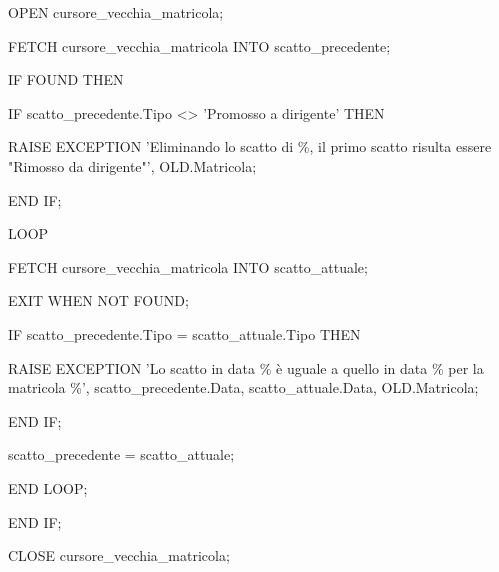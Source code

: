 \begin{flushleft}
\begin{description}
\begin{description}
                        \item OPEN cursore\_vecchia\_matricola;
                        \item FETCH cursore\_vecchia\_matricola INTO scatto\_precedente;
                        \vspace{0.5cm}
                        \item IF FOUND THEN
                        \begin{description}
                            \item IF scatto\_precedente.Tipo <> 'Promosso a dirigente' THEN
                            \begin{description}
                                \item RAISE EXCEPTION 'Eliminando lo scatto di \%, il primo scatto risulta essere "Rimosso da dirigente"', OLD.Matricola;
                            \end{description}
                            END IF;

                            \item LOOP
                            \begin{description}
                                \item FETCH cursore\_vecchia\_matricola INTO scatto\_attuale;
                                \item EXIT WHEN NOT FOUND;
                                
                                \vspace{0.5cm}
                                
                                \item IF scatto\_precedente.Tipo = scatto\_attuale.Tipo THEN
                                \begin{description}
                                    \item RAISE EXCEPTION 'Lo scatto in data \% è uguale a quello in data \% per la matricola \%', scatto\_precedente.Data, scatto\_attuale.Data, OLD.Matricola;
                                \end{description}
                                \item END IF;

                                \vspace{0.5cm}
                                
                                \item scatto\_precedente = scatto\_attuale;
                            \end{description}
                            \item END LOOP;
                        \end{description}
                        \item END IF;
                        \item CLOSE cursore\_vecchia\_matricola;
                        

\end{description}
\end{description}
\end{flushleft}
